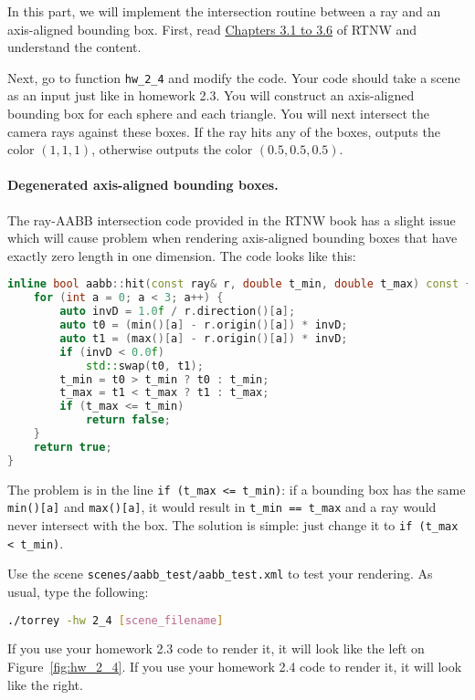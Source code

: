 In this part, we will implement the intersection routine between a ray and an axis-aligned bounding box. First, read \href{https://raytracing.github.io/books/RayTracingTheNextWeek.html#boundingvolumehierarchies}{Chapters 3.1 to 3.6} of RTNW and understand the content.

Next, go to function \lstinline{hw_2_4} and modify the code. Your code should take a scene as an input just like in homework 2.3. You will construct an axis-aligned bounding box for each sphere and each triangle. You will next intersect the camera rays against these boxes. If the ray hits any of the boxes, outputs the color $(1, 1, 1)$, otherwise outputs the color $(0.5, 0.5, 0.5)$.

\paragraph{Degenerated axis-aligned bounding boxes.}
The ray-AABB intersection code provided in the RTNW book has a slight issue which will cause problem when rendering axis-aligned bounding boxes that have exactly zero length in one dimension. The code looks like this:
\begin{lstlisting}[language=C++]
inline bool aabb::hit(const ray& r, double t_min, double t_max) const {
    for (int a = 0; a < 3; a++) {
        auto invD = 1.0f / r.direction()[a];
        auto t0 = (min()[a] - r.origin()[a]) * invD;
        auto t1 = (max()[a] - r.origin()[a]) * invD;
        if (invD < 0.0f)
            std::swap(t0, t1);
        t_min = t0 > t_min ? t0 : t_min;
        t_max = t1 < t_max ? t1 : t_max;
        if (t_max <= t_min)
            return false;
    }
    return true;
}
\end{lstlisting}
The problem is in the line \lstinline{if (t_max <= t_min)}: if a bounding box has the same \lstinline{min()[a]} and \lstinline{max()[a]}, it would result in \lstinline{t_min == t_max} and a ray would never intersect with the box. The solution is simple: just change it to \lstinline{if (t_max < t_min)}.

Use the scene \lstinline{scenes/aabb_test/aabb_test.xml} to test your rendering. As usual, type the following:
\begin{lstlisting}[language=bash]
./torrey -hw 2_4 [scene_filename]
\end{lstlisting}
If you use your homework 2.3 code to render it, it will look like the left on Figure~\ref{fig:hw_2_4}. If you use your homework 2.4 code to render it, it will look like the right.

